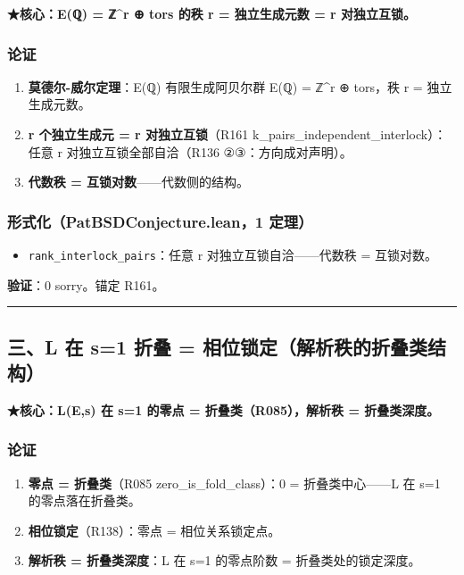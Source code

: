 \documentclass[
]{article}
\providecommand{\tightlist}{%
  \setlength{\itemsep}{0pt}\setlength{\parskip}{0pt}}
\begin{document}
\textbf{★核心：E(ℚ) = ℤ\^{}r ⊕ tors 的秩 r = 独立生成元数 = r
对独立互锁。}

\subsubsection{论证}\label{ux8bbaux8bc1-1}

\begin{enumerate}
\def\labelenumi{\arabic{enumi}.}
\tightlist
\item
  \textbf{莫德尔-威尔定理}：E(ℚ) 有限生成阿贝尔群 E(ℚ) = ℤ\^{}r ⊕
  tors，秩 r = 独立生成元数。
\item
  \textbf{r 个独立生成元 = r 对独立互锁}（R161
  k\_pairs\_independent\_interlock）：任意 r 对独立互锁全部自洽（R136
  ②③：方向成对声明）。
\item
  \textbf{代数秩 = 互锁对数}------代数侧的结构。
\end{enumerate}

\subsubsection{形式化（PatBSDConjecture.lean，1
定理）}\label{ux5f62ux5f0fux5316patbsdconjecture.lean1-ux5b9aux7406-1}

\begin{itemize}
\tightlist
\item
  \texttt{rank\_interlock\_pairs}：任意 r 对独立互锁自洽------代数秩 =
  互锁对数。
\end{itemize}

\textbf{验证}：0 sorry。锚定 R161。

\begin{center}\rule{0.5\linewidth}{0.5pt}\end{center}

\subsection{三、L 在 s=1 折叠 =
相位锁定（解析秩的折叠类结构）}\label{ux4e09l-ux5728-s1-ux6298ux53e0-ux76f8ux4f4dux9501ux5b9aux89e3ux6790ux79e9ux7684ux6298ux53e0ux7c7bux7ed3ux6784}

\textbf{★核心：L(E,s) 在 s=1 的零点 = 折叠类（R085），解析秩 =
折叠类深度。}

\subsubsection{论证}\label{ux8bbaux8bc1-2}

\begin{enumerate}
\def\labelenumi{\arabic{enumi}.}
\tightlist
\item
  \textbf{零点 = 折叠类}（R085 zero\_is\_fold\_class）：0 =
  折叠类中心------L 在 s=1 的零点落在折叠类。
\item
  \textbf{相位锁定}（R138）：零点 = 相位关系锁定点。
\item
  \textbf{解析秩 = 折叠类深度}：L 在 s=1 的零点阶数 =
  折叠类处的锁定深度。
\end{enumerate}
\end{document}
